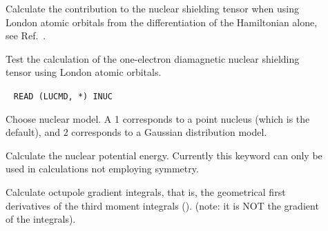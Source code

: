 \begin{description}
\item[] Calculate the contribution to the nuclear
shielding tensor when using London atomic orbitals from the 
differentiation of the Hamiltonian alone, see Ref.~\cite{thpjjcp95}.


\item[] Test the calculation of the one-electron
diamagnetic  nuclear shielding
tensor using London atomic orbitals.

\item[]\verb| |\newline
\verb|READ (LUCMD, *) INUC|

Choose nuclear model. A 1 corresponds to a point nucleus (which is the
default), and 2 corresponds to a Gaussian distribution model.

\item[] Calculate the nuclear potential energy.
Currently this keyword can only be used in calculations not employing
symmetry.



\item[]
Calculate octupole gradient integrals, that is, the geometrical first
derivatives of the third moment integrals ().
(note: it is NOT the gradient of the  integrals).


\end{description}
